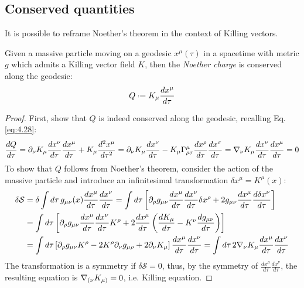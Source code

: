 \subsection{Conserved quantities}

It is possible to reframe Noether's theorem in the context of Killing vectors.

\begin{theorem}[Noether]
  Given a massive particle moving on a geodesic $ x^\mu(\tau) $ in a spacetime with metric $ g $ which admits a Killing vector field $ K $, then the \textit{Noether charge} is conserved along the geodesic:
  \begin{equation}
    Q \defeq K_\mu \frac{dx^\mu}{d\tau}
    \label{eq:4.29}
  \end{equation}
\end{theorem}
\begin{proof}
  First, show that $ Q $ is indeed conserved along the geodesic, recalling Eq. \ref{eq:4.28}:
  \begin{equation*}
    \frac{dQ}{d\tau} = \partial_\nu K_\mu \frac{dx^\nu}{d\tau} \frac{dx^\mu}{d\tau} + K_\mu \frac{d^2 x^\mu}{d\tau^2} = \partial_\nu K_\mu \frac{dx^\nu}{d\tau} - K_\mu \Gamma^\mu_{\rho \sigma} \frac{dx^\rho}{d\tau} \frac{dx^\sigma}{d\tau} = \nabla_\nu K_\mu \frac{dx^\nu}{d\tau} \frac{dx^\mu}{d\tau} = 0
  \end{equation*}
  To show that $ Q $ follows from Noether's theorem, consider the action of the massive particle and introduce an infinitesimal transformation $ \delta x^\mu = K^\mu (x) $:
  \begin{equation*}
    \begin{split}
      \delta \mathcal{S}
      &= \delta \int d\tau\, g_{\mu \nu}(x) \frac{dx^\mu}{d\tau} \frac{dx^\nu}{d\tau} = \int d\tau \left[ \partial_\rho g_{\mu \nu} \frac{dx^\mu}{d\tau} \frac{dx^\nu}{d\tau} \delta x^\rho + 2 g_{\mu \nu} \frac{dx^\mu}{d\tau} \frac{d \delta x^\nu}{d\tau} \right] \\
      &= \int d\tau \left[ \partial_\rho g_{\mu \nu} \frac{dx^\mu}{d\tau} \frac{dx^\nu}{d\tau} K^\rho + 2 \frac{dx^\mu}{d\tau} \left( \frac{dK_\mu}{d\tau} - K^\nu \frac{dg_{\mu \nu}}{d\tau} \right) \right] \\
      &= \int d\tau \left[ \partial_\rho g_{\mu \nu} K^\rho - 2 K^\rho \partial_\nu g_{\mu \rho} + 2 \partial_\nu K_\mu \right] \frac{dx^\mu}{d\tau} \frac{dx^\nu}{d\tau} = \int d\tau\, 2 \nabla_\nu K_\mu \frac{dx^\mu}{d\tau} \frac{dx^\nu}{d\tau}
    \end{split}
  \end{equation*}
  The transformation is a symmetry if $ \delta \mathcal{S} = 0 $, thus, by the symmetry of $ \frac{dx^\mu}{d\tau} \frac{dx^\nu}{d\tau} $, the resulting equation is $ \nabla_{(\nu} K_{\mu)} = 0 $, i.e. Killing equation.
\end{proof}

